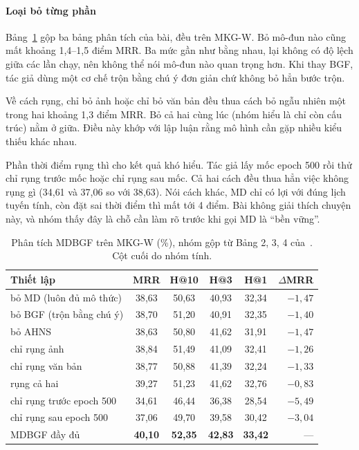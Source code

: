 \documentclass[conference,a4paper]{IEEEtran}
\begin{document}
\paragraph{Loại bỏ từng phần} Bảng~\ref{tab:mdbgf-ablation} gộp ba bảng phân tích của bài, đều trên MKG-W. Bỏ mô-đun nào cũng mất khoảng 1{,}4--1{,}5 điểm MRR. Ba mức gần như bằng nhau, lại không có độ lệch giữa các lần chạy, nên không thể nói mô-đun nào quan trọng hơn. Khi thay BGF, tác giả dùng một cơ chế trộn bằng chú ý đơn giản chứ không bỏ hẳn bước trộn.

Về cách rụng, chỉ bỏ ảnh hoặc chỉ bỏ văn bản đều thua cách bỏ ngẫu nhiên một trong hai khoảng 1{,}3 điểm MRR. Bỏ cả hai cùng lúc (nhóm hiểu là chỉ còn cấu trúc) nằm ở giữa. Điều này khớp với lập luận rằng mô hình cần gặp nhiều kiểu thiếu khác nhau.

Phần thời điểm rụng thì cho kết quả khó hiểu. Tác giả lấy mốc epoch 500 rồi thử chỉ rụng trước mốc hoặc chỉ rụng sau mốc. Cả hai cách đều thua hẳn việc không rụng gì (34{,}61 và 37{,}06 so với 38{,}63). Nói cách khác, MD chỉ có lợi với đúng lịch tuyến tính, còn đặt sai thời điểm thì mất tới 4 điểm. Bài không giải thích chuyện này, và nhóm thấy đây là chỗ cần làm rõ trước khi gọi MD là ``bền vững''.

\begin{table}[t]
\centering
\caption{Phân tích MDBGF trên MKG-W (\%), nhóm gộp từ Bảng 2, 3, 4 của~\cite{mdbgf}. Cột cuối do nhóm tính.}
\label{tab:mdbgf-ablation}
\footnotesize
\setlength{\tabcolsep}{3.5pt}
\begin{tabular}{l cccc r}
\toprule
Thiết lập & MRR & H@10 & H@3 & H@1 & $\Delta$MRR\\
\midrule
bỏ MD (luôn đủ mô thức)       & 38{,}63 & 50{,}63 & 40{,}93 & 32{,}34 & $-1{,}47$\\
bỏ BGF (trộn bằng chú ý)      & 38{,}70 & 51{,}20 & 40{,}91 & 32{,}35 & $-1{,}40$\\
bỏ AHNS                       & 38{,}63 & 50{,}80 & 41{,}62 & 31{,}91 & $-1{,}47$\\
\midrule
chỉ rụng ảnh                  & 38{,}84 & 51{,}49 & 41{,}09 & 32{,}41 & $-1{,}26$\\
chỉ rụng văn bản              & 38{,}77 & 50{,}88 & 41{,}39 & 32{,}24 & $-1{,}33$\\
rụng cả hai                   & 39{,}27 & 51{,}23 & 41{,}62 & 32{,}76 & $-0{,}83$\\
\midrule
chỉ rụng trước epoch 500      & 34{,}61 & 46{,}44 & 36{,}38 & 28{,}54 & $-5{,}49$\\
chỉ rụng sau epoch 500        & 37{,}06 & 49{,}70 & 39{,}58 & 30{,}42 & $-3{,}04$\\
\midrule
MDBGF đầy đủ                  & \textbf{40{,}10} & \textbf{52{,}35} & \textbf{42{,}83} & \textbf{33{,}42} & ---\\
\bottomrule
\end{tabular}
\end{table}
\end{document}
